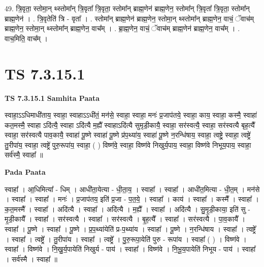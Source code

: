 \documentclass[17pt]{extarticle}
\begin{document}
49. त्रि॒वृता॒ स्तोमा॒न् थ्स्तोमा᳚न् त्रि॒वृता᳚ त्रि॒वृता॒ स्तोमा᳚न् ब्राह्म॒णेन॑ ब्राह्म॒णेन॒ स्तोमा᳚न् त्रि॒वृता᳚ त्रि॒वृता॒ स्तोमा᳚न् ब्राह्म॒णेन॑ । . त्रि॒वृतेति॑ त्रि - वृता᳚ । . स्तोमा᳚न् ब्राह्म॒णेन॑ ब्राह्म॒णेन॒ स्तोमा॒न् थ्स्तोमा᳚न् ब्राह्म॒णेन॒ वाचं॒ ॅवाच॑म् ब्राह्म॒णेन॒ स्तोमा॒न् थ्स्तोमा᳚न् ब्राह्म॒णेन॒ वाच᳚म् । . ब्रा॒ह्म॒णेन॒ वाचं॒ ॅवाच॑म् ब्राह्म॒णेन॑ ब्राह्म॒णेन॒ वाच᳚म् । . वाच॒मिति॒ वाच᳚म् । \newline
\pagebreak
{}

\section{ TS 7.3.15.1 }

\textbf{TS 7.3.15.1 } \newline
\textbf{Samhita Paata} \newline

स्वाहा॒ऽऽधिमाधी॑ताय॒ स्वाहा॒ स्वाहाऽऽधी॑तं॒ मन॑से॒ स्वाहा॒ स्वाहा॒ मनः॑ प्र॒जाप॑तये॒ स्वाहा॒ काय॒ स्वाहा॒ कस्मै॒ स्वाहा॑ कत॒मस्मै॒ स्वाहा ऽदि॑त्यै॒ स्वाहा ऽदि॑त्यै म॒ह्यै᳚ स्वाहाऽदि॑त्यै सुमृडी॒कायै॒ स्वाहा॒ सर॑स्वत्यै॒ स्वाहा॒ सर॑स्वत्यै बृह॒त्यै᳚ स्वाहा॒ सर॑स्वत्यै पाव॒कायै॒ स्वाहा॑ पू॒ष्णे स्वाहा॑ पू॒ष्णे प्र॑प॒थ्या॑य॒ स्वाहा॑ पू॒ष्णे न॒रन्धि॑षाय॒ स्वाहा॒ त्वष्ट्रे॒ स्वाहा॒ त्वष्ट्रे॑ तु॒रीपा॑य॒ स्वाहा॒ त्वष्ट्रे॑ पुरु॒रूपा॑य॒ स्वाहा॒ ( ) विष्ण॑वे॒ स्वाहा॒ विष्ण॑वे निखुर्य॒पाय॒ स्वाहा॒ विष्ण॑वे निभूय॒पाय॒ स्वाहा॒ सर्व॑स्मै॒ स्वाहा᳚ ॥ \newline

\textbf{Pada Paata} \newline

स्वाहा᳚ । आ॒धिमित्या᳚ - धिम् । आधी॑ता॒येत्या - धी॒ता॒य॒ । स्वाहा᳚ । स्वाहा᳚ । आधी॑त॒मित्या - धी॒त॒म् । मन॑से । स्वाहा᳚ । स्वाहा᳚ । मनः॑ । प्र॒जाप॑तय॒ इति॑ प्र॒जा - प॒त॒ये॒ । स्वाहा᳚ । काय॑ । स्वाहा᳚ । कस्मै᳚ । स्वाहा᳚ । क॒त॒मस्मै᳚ । स्वाहा᳚ । अदि॑त्यै । स्वाहा᳚ । अदि॑त्यै । म॒ह्यै᳚ । स्वाहा᳚ । अदि॑त्यै । सु॒मृ॒डी॒काया॒ इति॑ सु - मृ॒डी॒कायै᳚ । स्वाहा᳚ । सर॑स्वत्यै । स्वाहा᳚ । सर॑स्वत्यै । बृ॒ह॒त्यै᳚ । स्वाहा᳚ । सर॑स्वत्यै । पा॒व॒कायै᳚ । स्वाहा᳚ । पू॒ष्णे । स्वाहा᳚ । पू॒ष्णे । प्र॒प॒थ्या॑येति॑ प्र-प॒थ्या॑य । स्वाहा᳚ । पू॒ष्णे । न॒रन्धि॑षाय । स्वाहा᳚ । त्वष्ट्रे᳚ । स्वाहा᳚ । त्वष्ट्रे᳚ । तु॒रीपा॑य । स्वाहा᳚ । त्वष्ट्रे᳚ । पु॒रु॒रूपा॒येति॑ पुरु - रूपा॑य । स्वाहा᳚ ( ) । विष्ण॑वे । स्वाहा᳚ । विष्ण॑वे । नि॒खु॒र्य॒पायेति॑ निखुर्य - पाय॑ । स्वाहा᳚ । विष्ण॑वे । नि॒भू॒य॒पायेति॑ निभूय - पाय॑ । स्वाहा᳚ । सर्व॑स्मै । स्वाहा᳚ ॥  \newline
\end{document}
